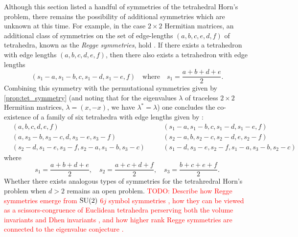 \documentclass[notitlepage, 10pt]{article}
\begin{document}
\begin{rem}
    Although this section listed a handful of symmetries of the tetrahedral Horn's problem, there remains the possibility of additional symmetries which are unknown at this time.
    For example, in the case $2\times 2$ Hermitian matrices, an additional class of symmetries on the set of edge-lengths $(a,b,c,e,d,f)$ of tetrahedra, known as the \textit{Regge symmetries}, hold \cite[Theorem 1.1]{akopyan2019regge,morozov2018new,boalch2007regge,ponzano1968semiclassical}.
    If there exists a tetrahedron with edge lengths $(a,b,c,d,e,f)$, then there also exists a tetrahedron with edge lengths
    \begin{equation}
        (s_1-a,s_1-b,c,s_1-d,s_1-e,f) \quad \text{where} \quad s_1 = \frac{a+b+d+e}{2}.
    \end{equation}
    Combining this symmetry with the permutational symmetries given by \cref{prop:tet_symmetry} (and noting that for the eigenvalues $\lambda$ of traceless $2 \times 2$ Hermitian matrices, $\lambda = (x, -x)$, we have $\lambda^{*} = \lambda$) one concludes the co-existence of a family of six tetrahedra with edge lengths given by \cite[Chapter 9]{varshalovich1988quantum}:
    \begin{equation}
        \begin{alignedat}{2}
            &(a,b,c,d,e,f) \quad
            &&(s_1-a,s_1-b,c,s_1-d,s_1-e,f) \\
            &(a,s_3-b,s_3-c,d,s_3-e,s_3-f) \quad
            &&(s_2-a,b,s_2-c,s_2-d,e,s_2-f) \\
            &(s_2-d,s_1-e,s_3-f,s_2-a,s_1-b,s_3-c) \quad
            &&(s_1-d,s_3-e,s_2-f,s_1-a,s_3-b,s_2-c)
        \end{alignedat}
    \end{equation}
    where
    \begin{equation}
        s_1 = \frac{a+b+d+e}{2}, \quad
        s_2 = \frac{a+c+d+f}{2}, \quad
        s_3 = \frac{b+c+e+f}{2}.
    \end{equation}
    Whether there exists analogous types of symmetries for the tetrahredral Horn's problem when $d>2$ remains an open problem.
    \textcolor{red}{TODO: Describe how Regge symmetries emerge from $\operatorname{SU}(2)$ $6j$ symbol symmetries \cite{boalch2007regge}, how they can be viewed as a scissors-congruence of Euclidean tetrahedra perserving both the volume invariants and Dhen invariants \cite{akopyan2019regge}, and how higher rank Regge symmetries are connected to the eigenvalue conjecture \cite{morozov2018new}.}
\end{rem}
\end{document}
